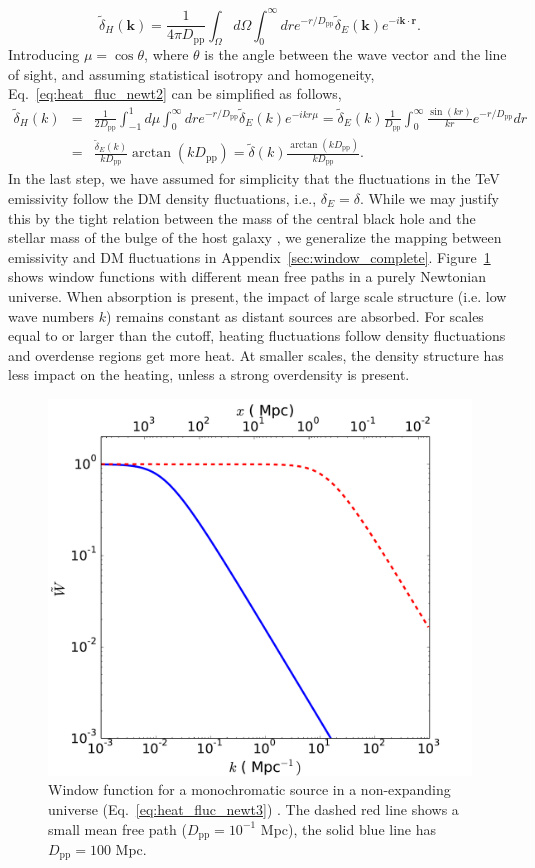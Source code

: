 \documentclass[numberedappendix]{emulateapj}
\begin{document}
\begin{equation}
  \label{eq:heat_fluc_newt2}
  \tilde{\delta}_H(\mathbf{k})=\frac{1}{4\pi D_{\mathrm{pp}}} \int_{\Omega}d\Omega\int_0^{\infty}  dr  e^{- r/D_{\mathrm{pp}}}  \tilde{\delta}_E(\mathbf{k}) e^{-i\mathbf{k}\cdot{\mathbf{r}}}.
\end{equation}
Introducing $\mu=\cos\theta$, where $\theta$ is the angle between the wave vector and the line of sight, and assuming statistical isotropy and homogeneity, Eq.~\eqref{eq:heat_fluc_newt2} can be simplified as follows,
\begin{eqnarray}
  \label{eq:heat_fluc_newt3}
  \tilde{\delta}_H(k)&=&  
  \frac{1}{2D_{\mathrm{pp}}} \int_{-1}^{1} d\mu \int_0^{\infty}dr   e^{-r/D_{\mathrm{pp}}} \tilde{\delta}_E(k) e^{-ikr\mu}
  =\tilde{\delta}_E(k)\frac{1}{D_{\mathrm{pp}} }\int_0^{\infty} \frac{\sin(kr)}{kr} e^{-r/D_{\mathrm{pp}}}   dr\\ \nonumber
 &=&\frac{\tilde{\delta}_E(k)}{k D_{\mathrm{pp}}} \arctan\left(k D_{\mathrm{pp}}\right)
  = \tilde{\delta}(k)\frac{\arctan\left(k D_{\mathrm{pp}}\right)}{k D_{\mathrm{pp}}} .
\end{eqnarray}
In the last step, we have assumed for simplicity that the fluctuations in the TeV emissivity follow the DM density fluctuations, i.e., $\delta_E=\delta$. While we may justify this by the tight relation between the mass of the central black hole and the stellar mass of the bulge of the host galaxy \citep{2004ApJ...604L..89H}, we generalize the mapping between emissivity and DM fluctuations in Appendix~\ref{sec:window_complete}. Figure~\ref{fig:window_newt} shows  window functions with different  mean free paths in a purely Newtonian universe.  When absorption is present,  the impact of large scale structure (i.e. low wave numbers $k$) remains constant as distant sources are absorbed. For scales equal to or larger than the cutoff, heating fluctuations follow density fluctuations and overdense regions get more heat. At smaller scales, the density structure has less impact on the heating, unless a strong overdensity is present.  

\begin{figure}
\centering
\includegraphics[width = .45\textwidth ]{newtonian_window}
\caption{Window function for a monochromatic source in a  non-expanding universe (Eq.~\eqref{eq:heat_fluc_newt3}) . The dashed red line
    shows a small mean free path
    ($D_{\mathrm{pp}}=10^{-1}$ Mpc), the solid blue line has
    $D_{\mathrm{pp}}=100 $ Mpc.}
\label{fig:window_newt}
\end{figure}
\end{document}
